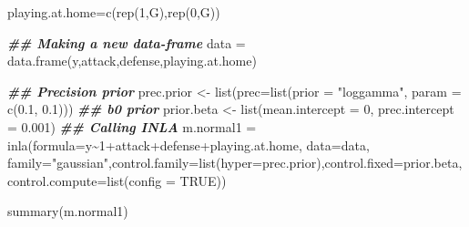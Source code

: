 \documentclass[
]{article}
\newenvironment{Shaded}{\begin{snugshade}}{\end{snugshade}}
\newcommand{\AttributeTok}[1]{\textcolor[rgb]{0.77,0.63,0.00}{#1}}
\newcommand{\ConstantTok}[1]{\textcolor[rgb]{0.00,0.00,0.00}{#1}}
\newcommand{\DecValTok}[1]{\textcolor[rgb]{0.00,0.00,0.81}{#1}}
\newcommand{\DocumentationTok}[1]{\textcolor[rgb]{0.56,0.35,0.01}{\textbf{\textit{#1}}}}
\newcommand{\FloatTok}[1]{\textcolor[rgb]{0.00,0.00,0.81}{#1}}
\newcommand{\FunctionTok}[1]{\textcolor[rgb]{0.00,0.00,0.00}{#1}}
\newcommand{\NormalTok}[1]{#1}
\newcommand{\OtherTok}[1]{\textcolor[rgb]{0.56,0.35,0.01}{#1}}
\newcommand{\SpecialCharTok}[1]{\textcolor[rgb]{0.00,0.00,0.00}{#1}}
\newcommand{\StringTok}[1]{\textcolor[rgb]{0.31,0.60,0.02}{#1}}
\begin{document}
\begin{Shaded}
\begin{Highlighting}[]
\NormalTok{playing.at.home}\OtherTok{=}\FunctionTok{c}\NormalTok{(}\FunctionTok{rep}\NormalTok{(}\DecValTok{1}\NormalTok{,G),}\FunctionTok{rep}\NormalTok{(}\DecValTok{0}\NormalTok{,G))}

\DocumentationTok{\#\# Making a new data{-}frame  }
\NormalTok{data }\OtherTok{=} \FunctionTok{data.frame}\NormalTok{(y,attack,defense,playing.at.home)}

\DocumentationTok{\#\# Precision prior}
\NormalTok{prec.prior }\OtherTok{\textless{}{-}} \FunctionTok{list}\NormalTok{(}\AttributeTok{prec=}\FunctionTok{list}\NormalTok{(}\AttributeTok{prior =} \StringTok{"loggamma"}\NormalTok{, }\AttributeTok{param =} \FunctionTok{c}\NormalTok{(}\FloatTok{0.1}\NormalTok{, }\FloatTok{0.1}\NormalTok{)))}
\DocumentationTok{\#\# b0 prior}
\NormalTok{prior.beta }\OtherTok{\textless{}{-}} \FunctionTok{list}\NormalTok{(}\AttributeTok{mean.intercept =} \DecValTok{0}\NormalTok{, }\AttributeTok{prec.intercept =} \FloatTok{0.001}\NormalTok{)}
\DocumentationTok{\#\# Calling INLA}
\NormalTok{m.normal1 }\OtherTok{=} \FunctionTok{inla}\NormalTok{(}\AttributeTok{formula=}\NormalTok{y}\SpecialCharTok{\textasciitilde{}}\DecValTok{1}\SpecialCharTok{+}\NormalTok{attack}\SpecialCharTok{+}\NormalTok{defense}\SpecialCharTok{+}\NormalTok{playing.at.home, }\AttributeTok{data=}\NormalTok{data, }\AttributeTok{family=}\StringTok{"gaussian"}\NormalTok{,}\AttributeTok{control.family=}\FunctionTok{list}\NormalTok{(}\AttributeTok{hyper=}\NormalTok{prec.prior),}\AttributeTok{control.fixed=}\NormalTok{prior.beta,}
                \AttributeTok{control.compute=}\FunctionTok{list}\NormalTok{(}\AttributeTok{config =} \ConstantTok{TRUE}\NormalTok{))}

\FunctionTok{summary}\NormalTok{(m.normal1)}
\end{Highlighting}
\end{Shaded}
\end{document}
